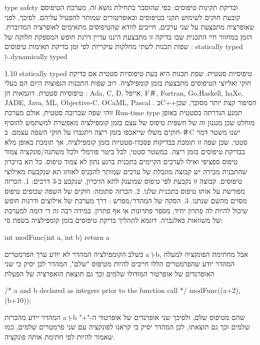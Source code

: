       type safety ובדיקת תקינות טיפוסים:
      כפי שהוסבר בתחילת נושא זה, מערכת הטיפוסם קובעת חוקים לשימוש תקני בטיפוסים ובאופרטורים שמותר להפעיל עליהם. לפיכך, לפני שאופרציה מתבצעת על שני ערכים, חייבים לוודא שהטיפוסים מתאימים לאופרציה המדוברת. הזמן במחזור חיי התכנית שבו בדיקה זו מתבצעת היננו עדיין דרגת חופש המספקת חלוקה של שפות תכנות לשתי מחלקות עיקריות לפי זמן בדיקת תאימות טיפוסים : statically typed וְ-.dynamically typed

      1.10 statically typed טיפוסיות סטטית:
      שפת תכנות היא בעת טיפוסיות סטטית אם בדיקת חוקי ואליוצי הטיפוסים מתבצעת בזמן קומפילציה. רוב שפות התכנות הנפוצות היום הם בעלי טיפוסיות סטטית. דוגמאות הן :
      Ada, C, D, אייפל, F＃, Fortran, Go,Haskell, haXe, JADE, Java, ML, Objective-C, OCaML, Pascal .
      בC++הסיפור קצת יותר מסובך, שכן זוהי שפה שברובה סטטית, אולם מערכת Run-time type תמנע הגדרתה בסטטית באופן מוחלט שכן מנגנון זה של חשפית טיפוס של עצם בזמן קומפילציה מאפשרת למשתמש להוסיף חוקים משלו שייאכפו בזמן ריצה ויתגברו על חוקי השפה עצמם.
      ב-＃C ישנו משטר דמוי סטטי, שכן שפה זו תומכת בבדיקות פסבדו-סטטיות בזמן קומפילציה, אך תומכת באופן מלא בבדיקת טיפוסים בזמן ריצה.
      במשטר סטטי, לכל ביטוי פורמלי ולכל משתנה/פונקציה צמוד טיפוס ספציפי ואילו לערכים הקיימים בתכנית ברגע נתון לא צמוד טיפוס. כל תא בזיכרון שהתכנית מכירה יש קבוצה מוגבלת של ערכים שמותר להכניס לאותו תא שנקבעת מאילוצי טיפוסים. קבוצה זו נקבעת לפי טיפוס שמוענק לתא הזיכרון, שנקבע ב-3 דרכים:
      1. הכרזה מפורשת על אותו טיפוס בתכנית שלנו.
      2. הכרזה סתומה: חוקים של השפה שכופים טיפוס מסוים מהשם שנתנו.
      3. הסקה של המהדר/מפרש : דרך מערכת של אילוצים ודרגות חופש שיכול להיות לה פתרון יחיד, מספר פתרונות או אף פתרון. במידה רבה זה די דומה למערכת של משוואות באלגברה.
      דוגמא לתהליך בדיקת טיפוסים בזמן קומפילציה בשפת סי:

      int modFunc(int a, int b) {
        return a%
      }

      בשלב הקומפילציה המהדר לא יודע ערך הפרמטרים a וְ-b, אבל מחתימת הפונקציה למעלה המהדר יודע שהפרמטרים הללו חייבים להיות מטיפוס "שלם", המהדר לכן יסיק כי שני האופרנדים של אופרטור המודולו שלמים וכך גם תוצאת הואפרציה של הפעלת %

      /* a and b declared as integers prior to the function call */
      modFunc((a+2),(b+10));

      המהדר יידע מהכרזת a וְ-b שהם מטיפוס שלם, ולפיכך שני אופרנדים של אופרטור ה-"+" שלמים וכך גם תוצאתו, לכן המהדר יסיק כי קראנו לפונקציה עם שני פרמטרים שלמים, כמו שאמור להיות לפי חתימת אותה פונקציה.

